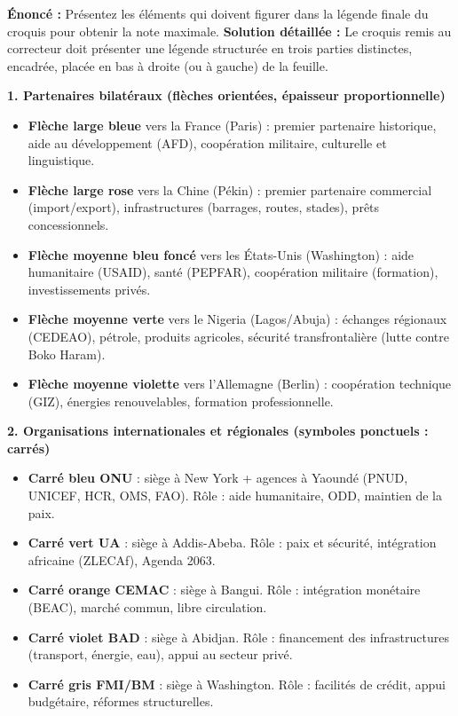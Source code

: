 \documentclass[11pt]{article}
\begin{document}
\begin{exoresolu}
\textbf{Énoncé :} Présentez les éléments qui doivent figurer dans la légende finale du croquis pour obtenir la note maximale.
\tcblower
\textbf{Solution détaillée :}
Le croquis remis au correcteur doit présenter une légende structurée en trois parties distinctes, encadrée, placée en bas à droite (ou à gauche) de la feuille.

\textbf{1. Partenaires bilatéraux (flèches orientées, épaisseur proportionnelle)}
\begin{itemize}
    \item \textbf{Flèche large bleue} vers la France (Paris) : premier partenaire historique, aide au développement (AFD), coopération militaire, culturelle et linguistique.
    \item \textbf{Flèche large rose} vers la Chine (Pékin) : premier partenaire commercial (import/export), infrastructures (barrages, routes, stades), prêts concessionnels.
    \item \textbf{Flèche moyenne bleu foncé} vers les États-Unis (Washington) : aide humanitaire (USAID), santé (PEPFAR), coopération militaire (formation), investissements privés.
    \item \textbf{Flèche moyenne verte} vers le Nigeria (Lagos/Abuja) : échanges régionaux (CEDEAO), pétrole, produits agricoles, sécurité transfrontalière (lutte contre Boko Haram).
    \item \textbf{Flèche moyenne violette} vers l'Allemagne (Berlin) : coopération technique (GIZ), énergies renouvelables, formation professionnelle.
\end{itemize}

\textbf{2. Organisations internationales et régionales (symboles ponctuels : carrés)}
\begin{itemize}
    \item \textbf{Carré bleu ONU} : siège à New York + agences à Yaoundé (PNUD, UNICEF, HCR, OMS, FAO). Rôle : aide humanitaire, ODD, maintien de la paix.
    \item \textbf{Carré vert UA} : siège à Addis-Abeba. Rôle : paix et sécurité, intégration africaine (ZLECAf), Agenda 2063.
    \item \textbf{Carré orange CEMAC} : siège à Bangui. Rôle : intégration monétaire (BEAC), marché commun, libre circulation.
    \item \textbf{Carré violet BAD} : siège à Abidjan. Rôle : financement des infrastructures (transport, énergie, eau), appui au secteur privé.
    \item \textbf{Carré gris FMI/BM} : siège à Washington. Rôle : facilités de crédit, appui budgétaire, réformes structurelles.
\end{itemize}


\end{exoresolu}
\end{document}

